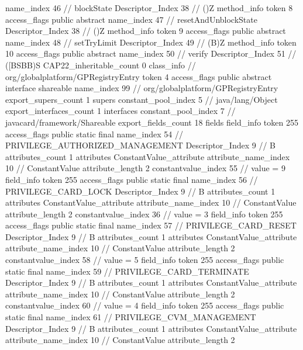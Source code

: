 {{{{{					name_index	46		// blockState
					Descriptor_Index	38		// ()Z
				}
				method_info {
					token	8
					access_flags	public abstract
					name_index	47		// resetAndUnblockState
					Descriptor_Index	38		// ()Z
				}
				method_info {
					token	9
					access_flags	public abstract
					name_index	48		// setTryLimit
					Descriptor_Index	49		// (B)Z
				}
				method_info {
					token	10
					access_flags	public abstract
					name_index	50		// verify
					Descriptor_Index	51		// ([BSBB)S
				}
			}
			CAP22_inheritable_count	0
		}
		class_info {		// org/globalplatform/GPRegistryEntry
			token	4
			access_flags	public abstract interface shareable
			name_index	99		// org/globalplatform/GPRegistryEntry
			export_supers_count	1
			supers {
				constant_pool_index	5		// java/lang/Object
			}
			export_interfaces_count	1
			interfaces {
				constant_pool_index	7		// javacard/framework/Shareable
			}
			export_fields_count	18
			fields {
			field_info {
				token	255
				access_flags	public static final
				name_index	54		// PRIVILEGE_AUTHORIZED_MANAGEMENT
				Descriptor_Index	9		// B
				attributes_count	1
				attributes {
				ConstantValue_attribute {
					attribute_name_index	10		// ConstantValue
					attribute_length	2
					constantvalue_index	55		// value = 9
				}
				}
			}
			field_info {
				token	255
				access_flags	public static final
				name_index	56		// PRIVILEGE_CARD_LOCK
				Descriptor_Index	9		// B
				attributes_count	1
				attributes {
				ConstantValue_attribute {
					attribute_name_index	10		// ConstantValue
					attribute_length	2
					constantvalue_index	36		// value = 3
				}
				}
			}
			field_info {
				token	255
				access_flags	public static final
				name_index	57		// PRIVILEGE_CARD_RESET
				Descriptor_Index	9		// B
				attributes_count	1
				attributes {
				ConstantValue_attribute {
					attribute_name_index	10		// ConstantValue
					attribute_length	2
					constantvalue_index	58		// value = 5
				}
				}
			}
			field_info {
				token	255
				access_flags	public static final
				name_index	59		// PRIVILEGE_CARD_TERMINATE
				Descriptor_Index	9		// B
				attributes_count	1
				attributes {
				ConstantValue_attribute {
					attribute_name_index	10		// ConstantValue
					attribute_length	2
					constantvalue_index	60		// value = 4
				}
				}
			}
			field_info {
				token	255
				access_flags	public static final
				name_index	61		// PRIVILEGE_CVM_MANAGEMENT
				Descriptor_Index	9		// B
				attributes_count	1
				attributes {
				ConstantValue_attribute {
					attribute_name_index	10		// ConstantValue
					attribute_length	2
}}}}}}}
